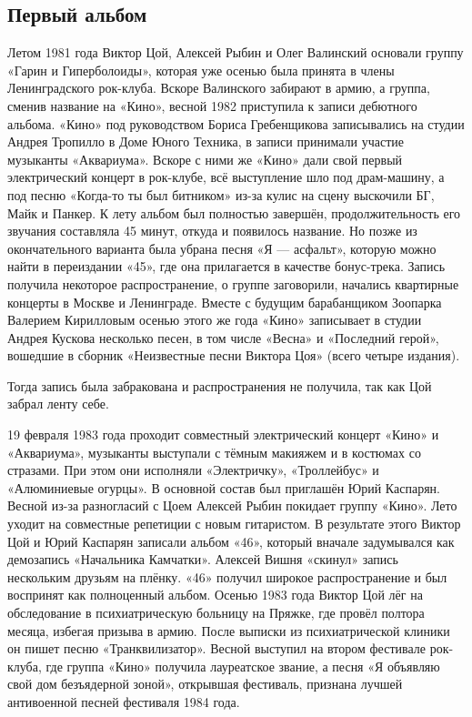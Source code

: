 \subsection{Первый альбом}
Летом 1981 года Виктор Цой, Алексей Рыбин и Олег Валинский основали группу «Гарин и Гиперболоиды», которая уже осенью была принята в члены Ленинградского рок-клуба. Вскоре Валинского забирают в армию, а группа, сменив название на «Кино», весной 1982 приступила к записи дебютного альбома. «Кино» под руководством Бориса Гребенщикова записывались на студии Андрея Тропилло в Доме Юного Техника, в записи принимали участие музыканты «Аквариума». Вскоре с ними же «Кино» дали свой первый электрический концерт в рок-клубе, всё выступление шло под драм-машину, а под песню «Когда-то ты был битником» из-за кулис на сцену выскочили БГ, Майк и Панкер. К лету альбом был полностью завершён, продолжительность его звучания составляла 45 минут, откуда и появилось название. Но позже из окончательного варианта была убрана песня «Я --- асфальт», которую можно найти в переиздании «45», где она прилагается в качестве бонус-трека. Запись получила некоторое распространение, о группе заговорили, начались квартирные концерты в Москве и Ленинграде. Вместе с будущим барабанщиком Зоопарка Валерием Кирилловым осенью этого же года «Кино» записывает в студии Андрея Кускова несколько песен, в том числе «Весна» и «Последний герой», вошедшие в сборник «Неизвестные песни Виктора Цоя» (всего четыре издания).

Тогда запись была забракована и распространения не получила, так как Цой забрал ленту себе.

19 февраля 1983 года проходит совместный электрический концерт «Кино» и «Аквариума», музыканты выступали с тёмным макияжем и в костюмах со стразами. При этом они исполняли «Электричку», «Троллейбус» и «Алюминиевые огурцы». В основной состав был приглашён Юрий Каспарян. Весной из-за разногласий с Цоем Алексей Рыбин покидает группу «Кино». Лето уходит на совместные репетиции с новым гитаристом. В результате этого Виктор Цой и Юрий Каспарян записали альбом «46», который вначале задумывался как демозапись «Начальника Камчатки». Алексей Вишня «скинул» запись нескольким друзьям на плёнку. «46» получил широкое распространение и был воспринят как полноценный альбом. Осенью 1983 года Виктор Цой лёг на обследование в психиатрическую больницу на Пряжке, где провёл полтора месяца, избегая призыва в армию. После выписки из психиатрической клиники он пишет песню «Транквилизатор». Весной выступил на втором фестивале рок-клуба, где группа «Кино» получила лауреатское звание, а песня «Я объявляю свой дом безъядерной зоной», открывшая фестиваль, признана лучшей антивоенной песней фестиваля 1984 года.



